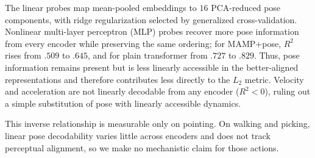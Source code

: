\documentclass[letterpaper]{article} %
\begin{document}
The linear probes map mean-pooled embeddings to $16$ PCA-reduced pose components, with ridge regularization selected by generalized cross-validation. Nonlinear multi-layer perceptron (MLP) probes recover more pose information from every encoder while preserving the same ordering; for MAMP+pose, $R^2$ rises from $.509$ to $.645$, and for plain transformer from $.727$ to $.829$. Thus, pose information remains present but is less linearly accessible in the better-aligned representations and therefore contributes less directly to the $L_2$ metric. Velocity and acceleration are not linearly decodable from any encoder ($R^2<0$), ruling out a simple substitution of pose with linearly accessible dynamics.

This inverse relationship is measurable only on pointing. On walking and picking, linear pose decodability varies little across encoders and does not track perceptual alignment, so we make no mechanistic claim for those actions.



\end{document}
